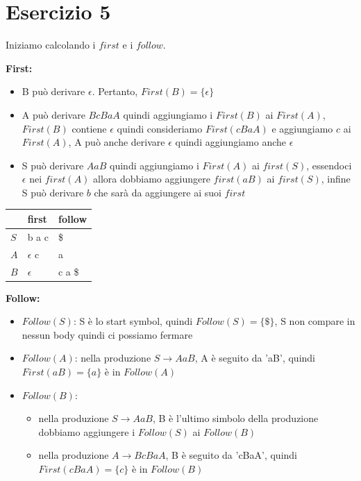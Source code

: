 \documentclass[11pt]{article}
\begin{document}
\section*{Esercizio 5}
Iniziamo calcolando i $first$ e i $follow$.
\begin{multicols}{2}
\noindent\textbf{First:}
\begin{itemize}
  \item B può derivare $\epsilon$. Pertanto, $First(B) = \{\epsilon\}$
  \item A può derivare $BcBaA$ quindi aggiungiamo i $First(B)$ ai $First(A)$, $First(B)$ contiene $\epsilon$
  quindi consideriamo $First(cBaA)$ e aggiungiamo $c$ ai $First(A)$,
  A può anche derivare $\epsilon$ quindi aggiungiamo anche $\epsilon$
  \item S può derivare $AaB$ quindi aggiungiamo i $First(A)$ ai $first(S)$,
  essendoci $\epsilon$ nei $first(A)$ allora dobbiamo aggiungere $first(aB)$ ai $first(S)$, infine S può derivare $b$ che sarà da aggiungere ai suoi $first$ 
\end{itemize}
\begin{table}[H]  
  \centering
  \begin{tabularx}{\linewidth}{|>{\centering\arraybackslash}X|>{\centering\arraybackslash}X|>{\centering\arraybackslash}X|}
    \hline
    & first & follow  \\
    \hline
    $S$ & b a c & \$ \\
    \hline
    $A$ & $\epsilon$ c & a \\
    \hline
    $B$ & $\epsilon$ & c a \$ \\
    \hline
  \end{tabularx}
  \label{tab:05-first-follow}
\end{table}
\textbf{Follow:} 
\begin{itemize}
  \item $Follow(S)$: S è lo start symbol, quindi $Follow(S) = \{\$\}$, S non compare in nessun body quindi ci possiamo fermare
  \item $Follow(A)$: nella produzione $S \to AaB$, A è seguito da 'aB', quindi $First(aB) = \{a\}$ è in $Follow(A)$
  \item $Follow(B)$:
  \begin{itemize}
    \small
    \item nella produzione $S \to AaB$, B è l'ultimo simbolo della produzione dobbiamo aggiungere i $Follow(S)$ ai $Follow(B)$
    \item nella produzione $A \to BcBaA$, B è seguito da 'cBaA', quindi $First(cBaA) = \{c\}$ è in $Follow(B)$
  \end{itemize} 
\end{itemize}
\end{multicols}
\end{document}
